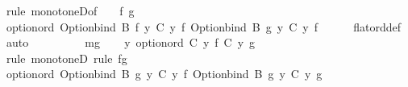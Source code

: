 \begin{isabellebody}
\ {\isacharparenleft}{\kern0pt}rule\ monotoneD{\isacharbrackleft}{\kern0pt}of\ {\isacharunderscore}{\kern0pt}\ {\isacharunderscore}{\kern0pt}\ {\isacharunderscore}{\kern0pt}\ f\ g{\isacharbrackright}{\kern0pt}{\isacharparenright}{\kern0pt}\isanewline
\ \ \isamarkupfalse%
\ \isamarkupfalse%
\ {\isachardoublequoteopen}option{\isacharunderscore}{\kern0pt}ord\ {\isacharparenleft}{\kern0pt}Option{\isachardot}{\kern0pt}bind\ {\isacharparenleft}{\kern0pt}B\ f{\isacharparenright}{\kern0pt}\ {\isacharparenleft}{\kern0pt}{\isasymlambda}y{\isachardot}{\kern0pt}\ C\ y\ f{\isacharparenright}{\kern0pt}{\isacharparenright}{\kern0pt}\ {\isacharparenleft}{\kern0pt}Option{\isachardot}{\kern0pt}bind\ {\isacharparenleft}{\kern0pt}B\ g{\isacharparenright}{\kern0pt}\ {\isacharparenleft}{\kern0pt}{\isasymlambda}y{\isachardot}{\kern0pt}\ C\ y\ f{\isacharparenright}{\kern0pt}{\isacharparenright}{\kern0pt}{\isachardoublequoteclose}\isanewline
\ \ \ \ \isamarkupfalse%
\ flat{\isacharunderscore}{\kern0pt}ord{\isacharunderscore}{\kern0pt}def\ \isamarkupfalse%
\ auto\ \ \ \ \isanewline
\ \ \isamarkupfalse%
\ \isamarkupfalse%
\ mg\isanewline
\ \ \isamarkupfalse%
\ {\isachardoublequoteopen}{\isasymAnd}y{\isacharprime}{\kern0pt}{\isachardot}{\kern0pt}\ option{\isacharunderscore}{\kern0pt}ord\ {\isacharparenleft}{\kern0pt}C\ y{\isacharprime}{\kern0pt}\ f{\isacharparenright}{\kern0pt}\ {\isacharparenleft}{\kern0pt}C\ y{\isacharprime}{\kern0pt}\ g{\isacharparenright}{\kern0pt}{\isachardoublequoteclose}\isanewline
\ \ \ \ \isamarkupfalse%
\ {\isacharparenleft}{\kern0pt}rule\ monotoneD{\isacharparenright}{\kern0pt}\ {\isacharparenleft}{\kern0pt}rule\ fg{\isacharparenright}{\kern0pt}\isanewline
\ \ \isamarkupfalse%
\ \isamarkupfalse%
\ {\isachardoublequoteopen}option{\isacharunderscore}{\kern0pt}ord\ {\isacharparenleft}{\kern0pt}Option{\isachardot}{\kern0pt}bind\ {\isacharparenleft}{\kern0pt}B\ g{\isacharparenright}{\kern0pt}\ {\isacharparenleft}{\kern0pt}{\isasymlambda}y{\isacharprime}{\kern0pt}{\isachardot}{\kern0pt}\ C\ y{\isacharprime}{\kern0pt}\ f{\isacharparenright}{\kern0pt}{\isacharparenright}{\kern0pt}\ {\isacharparenleft}{\kern0pt}Option{\isachardot}{\kern0pt}bind\ {\isacharparenleft}{\kern0pt}B\ g{\isacharparenright}{\kern0pt}\ {\isacharparenleft}{\kern0pt}{\isasymlambda}y{\isacharprime}{\kern0pt}{\isachardot}{\kern0pt}\ C\ y{\isacharprime}{\kern0pt}\ g{\isacharparenright}{\kern0pt}{\isacharparenright}{\kern0pt}{\isachardoublequoteclose}\isanewline

\end{isabellebody}
